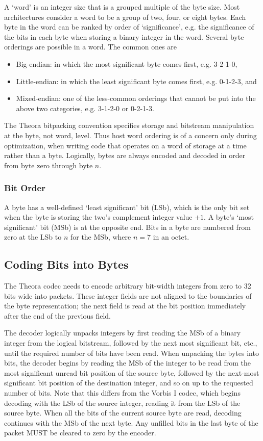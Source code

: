 \documentclass[11pt,letterpaper]{article}
\begin{document}
A `word' is an integer size that is a grouped multiple of the byte size.
Most architectures consider a word to be a group of two, four, or eight bytes.
Each byte in the word can be ranked by order of `significance', e.g. the
 significance of the bits in each byte when storing a binary integer in the
 word.
Several byte orderings are possible in a word.
The common ones are
\begin{itemize}
\item{Big-endian:}
in which the most significant byte comes first, e.g. 3-2-1-0,
\item{Little-endian:}
in which the least significant byte comes first, e.g. 0-1-2-3, and
\item{Mixed-endian:}
one of the less-common orderings that cannot be put into the above two
 categories, e.g. 3-1-2-0 or 0-2-1-3.
\end{itemize}

The Theora bitpacking convention specifies storage and bitstream manipulation
 at the byte, not word, level.
Thus host word ordering is of a concern only during optimization, when writing
 code that operates on a word of storage at a time rather than a byte.
Logically, bytes are always encoded and decoded in order from byte zero through
 byte $n$.

\subsubsection{Bit Order}

A byte has a well-defined `least significant' bit (LSb), which is the only bit
 set when the byte is storing the two's complement integer value $+1$.
A byte's `most significant' bit (MSb) is at the opposite end.
Bits in a byte are numbered from zero at the LSb to $n$ for the MSb, where
 $n=7$ in an octet.

\subsection{Coding Bits into Bytes}

The Theora codec needs to encode arbitrary bit-width integers from zero to 32
 bits wide into packets.
These integer fields are not aligned to the boundaries of the byte
 representation; the next field is read at the bit position immediately
 after the end of the previous field.

The decoder logically unpacks integers by first reading the MSb of a binary
 integer from the logical bitstream, followed by the next most significant
 bit, etc., until the required number of bits have been read.
When unpacking the bytes into bits, the decoder begins by reading the MSb of
 the integer to be read from the most significant unread bit position of the
 source byte, followed by the next-most significant bit position of the
 destination integer, and so on up to the requested number of bits.
Note that this differs from the Vorbis I codec, which
 begins decoding with the LSb of the source integer, reading it from the
 LSb of the source byte.
When all the bits of the current source byte are read, decoding continues with
 the MSb of the next byte.
Any unfilled bits in the last byte of the packet MUST be cleared to zero by the
 encoder.
\end{document}
